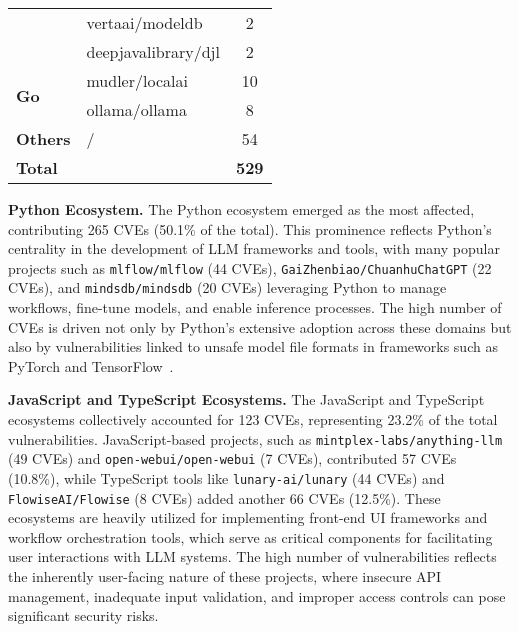 \begin{table}[t]
\begin{tabular}{llc}
                             & vertaai/modeldb                            & 2             \\
                             & deepjavalibrary/djl                        & 2             \\
\midrule
\multirow{2}{*}{\textbf{Go}}                         & mudler/localai                             & 10            \\
                             & ollama/ollama                              & 8             \\
\midrule
\multirow{1}{*}{\textbf{Others}}         & /                                    & 54             \\
\midrule
\textbf{Total}             &                                            & \textbf{529}  \\
\bottomrule
\end{tabular}
\end{table}




\noindent \textbf{Python Ecosystem.}  
The Python ecosystem emerged as the most affected, contributing 265 CVEs (50.1\% of the total). This prominence reflects Python's centrality in the development of LLM frameworks and tools, with many popular projects such as \texttt{mlflow/mlflow} (44 CVEs), \texttt{GaiZhenbiao/ChuanhuChatGPT} (22 CVEs), and \texttt{mindsdb/mindsdb} (20 CVEs) leveraging Python to manage workflows, fine-tune models, and enable inference processes.  The high number of CVEs is driven not only by Python’s extensive adoption across these domains but also by vulnerabilities linked to unsafe model file formats in frameworks such as PyTorch and TensorFlow~\cite{zhao2024malhug,zhu2025tensorflow}.

\noindent \textbf{JavaScript and TypeScript Ecosystems.}  
The JavaScript and TypeScript ecosystems collectively accounted for 123 CVEs, representing 23.2\% of the total vulnerabilities. JavaScript-based projects, such as \texttt{mintplex-labs/anything-llm} (49 CVEs) and \texttt{open-webui/open-webui} (7 CVEs), contributed 57 CVEs (10.8\%), while TypeScript tools like \texttt{lunary-ai/lunary} (44 CVEs) and \texttt{FlowiseAI/Flowise} (8 CVEs) added another 66 CVEs (12.5\%). These ecosystems are heavily utilized for implementing front-end UI frameworks and workflow orchestration tools, which serve as critical components for facilitating user interactions with LLM systems. The high number of vulnerabilities reflects the inherently user-facing nature of these projects, where insecure API management, inadequate input validation, and improper access controls can pose significant security risks. 

